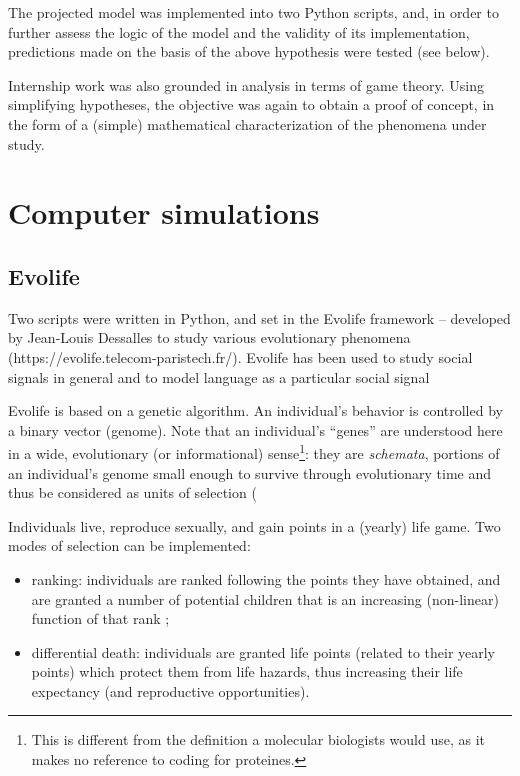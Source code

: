 \documentclass[a4paper,12pt]{report}
\begin{document}
The projected model was implemented into two Python scripts,
and, in order to further assess the logic of the model and the validity
of its implementation, predictions made on the basis of the above hypothesis
were tested (see below). %

Internship work was also grounded in analysis in terms of game theory.
Using simplifying hypotheses, the objective was again to obtain a proof of 
concept, in the form of a (simple) mathematical characterization of the phenomena
under study.

\section{Computer simulations}

\subsection{Evolife}
Two scripts were written in Python, and set in the Evolife framework
– developed by Jean-Louis Dessalles to study various evolutionary phenomena
(https://evolife.telecom-paristech.fr/). Evolife has been used to study social
signals in general %
and to model language as a particular social signal

Evolife is based on a genetic algorithm.
An individual's behavior is controlled by a binary vector (genome).
Note that an individual’s “genes” are understood here in a wide, evolutionary
(or informational) sense\footnote{
    This is different from the definition a molecular biologists would use,
    as it makes no reference to coding for proteines.}:
they are \emph{schemata}, portions of an
individual’s genome small enough to survive through evolutionary time and thus
be considered as units of selection (%

Individuals live, reproduce sexually, and gain points in a (yearly) life game.
Two modes of selection can be implemented:
\begin{itemize}
    \item ranking: individuals are ranked following the points they have
    obtained, and are granted a number of potential children that is an 
    increasing (non-linear) function of that rank ;
    \item differential death: individuals are granted life points
    (related to their
    yearly points) which protect them from life hazards, thus increasing
    their life expectancy (and reproductive opportunities).
\end{itemize}
\end{document}
